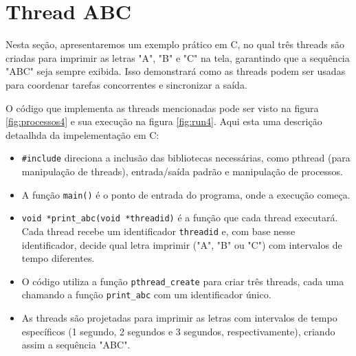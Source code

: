 \documentclass[
	12pt,				%
	openright,			%
	oneside,			%
	a4paper,			%
	chapter=TITLE,		%
	english,			%
	french,				%
	spanish,			%
	brazil				%
	]{abntex2}
\theoremstyle{definition}
\begin{document}
\section{Thread ABC}

Nesta seção, apresentaremos um exemplo prático em C, no qual três threads são 
criadas para imprimir as letras "A", "B" e "C" na tela, garantindo que 
a sequência "ABC" seja sempre exibida. Isso demonstrará como as threads 
podem ser usadas para coordenar tarefas concorrentes e sincronizar a saída.

O código que implementa as threads mencionadas pode ser visto na figura \ref{fig:processos4}
e sua execução na figura \ref{fig:run4}. Aqui esta uma descrição detaalhda da impelementação em C:

\begin{itemize}
    
    \item \texttt{\#include} direciona a inclusão das bibliotecas necessárias, como pthread (para manipulação de threads), entrada/saída padrão e manipulação de processos.
    \item A função \texttt{main()} é o ponto de entrada do programa, onde a execução começa.
    \item \texttt{void *print\_abc(void *threadid)} é a função que cada thread executará. Cada thread recebe um identificador \texttt{threadid} e, com base nesse identificador, decide qual letra imprimir ("A", "B" ou "C") com intervalos de tempo diferentes.
    \item O código utiliza a função \texttt{pthread\_create} para criar três threads, cada uma chamando a função \texttt{print\_abc} com um identificador único.
    \item As threads são projetadas para imprimir as letras com intervalos de tempo específicos (1 segundo, 2 segundos e 3 segundos, respectivamente), criando assim a sequência "ABC".

\end{itemize}
\end{document}
